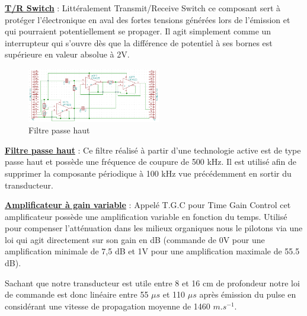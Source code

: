 \documentclass[12pt]{article}
\begin{document}
\textbf{\underline{T/R Switch}} : Littéralement Transmit/Receive Switch ce composant sert à protéger l'électronique en aval des fortes tensions générées lors de l'émission et qui pourraient potentiellement se propager. Il agit simplement comme un interrupteur qui s'ouvre dès que la différence de potentiel à ses bornes est supérieure en valeur absolue à 2V.\par

\vspace{10pt}
\newpage

\begin{figure}
  \vspace{-30pt}
  \hspace{-0pt}
  \begin{center}
    \includegraphics[width=0.52\textwidth]{Images_Rapport/passehaut}
  \end{center}
  \vspace{-5pt}
  \caption{Filtre passe haut}
  \vspace{-10pt}
\end{figure}
\textbf{\underline{Filtre passe haut}} : Ce filtre réalisé à partir d'une technologie active est de type passe haut et possède une fréquence de coupure de 500 kHz. Il est utilisé afin de supprimer la composante périodique à 100 kHz vue précédemment en sortir du transducteur.\par
\vspace{60pt}

\textbf{\underline{Amplificateur à gain variable}} : Appelé T.G.C pour Time Gain Control cet amplificateur possède une amplification variable en fonction du temps. Utilisé pour compenser l'atténuation dans les milieux organiques nous le pilotons via une loi qui agit directement sur son gain en dB (commande de 0V pour une amplification minimale de 7,5 dB et 1V pour une amplification maximale de 55.5 dB). \par 
Sachant que notre transducteur est utile entre 8 et 16 cm de profondeur notre loi de commande est donc linéaire entre 55 $\mu s$ et 110 $\mu s$ après émission du pulse en considérant une vitesse de propagation moyenne de 1460 $m.s^{-1}$.
\end{document}
